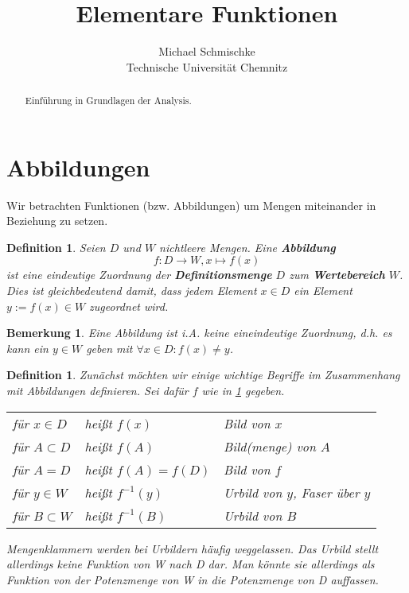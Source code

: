 \documentclass{article}
\title{Elementare Funktionen}
\author{Michael Schmischke\\
Technische Universit\"at Chemnitz
}
\newtheorem{bem}[lemma]{Bemerkung}
\newtheorem{definition}[lemma]{Definition}
\numberwithin{lemma}{section}
\begin{document}
\maketitle %

\begin{abstract}
	\noindent Einf\"uhrung in Grundlagen der Analysis. 
\end{abstract}


\section{Abbildungen}

Wir betrachten Funktionen (bzw. Abbildungen) um Mengen miteinander in Beziehung zu setzen.

\begin{definition}\label{def}
Seien $D$ und $W$ nichtleere Mengen. Eine \textbf{Abbildung} \[ f: D \to W, x \mapsto f(x) \] ist eine eindeutige Zuordnung der \textbf{Definitionsmenge} $D$ zum \textbf{Wertebereich} $W$. Dies ist gleichbedeutend damit, dass jedem Element $x \in D$ ein Element $y := f(x) \in W$ zugeordnet wird.
\end{definition}

\begin{bem}
Eine Abbildung ist i.A. keine eineindeutige Zuordnung, d.h. es kann ein $y \in W$ geben mit $\forall x \in D : f(x) \neq y$.
\end{bem}

\begin{definition}
Zunächst möchten wir einige wichtige Begriffe im Zusammenhang mit Abbildungen definieren. Sei dafür $f$ wie in \cref{def} gegeben.

\begin{tabular}{lll}
 für $x \in D$ & heißt $f(x)$ & Bild von $x$ \\
 für $A \subset D$ & heißt $f(A)$ & Bild(menge) von $A$ \\
 für $A = D$ & heißt $f(A)=f(D)$ & Bild von $f$ \\
 für $y \in W$ & heißt $f^{-1}(y)$ & Urbild von $y$, Faser über $y$ \\
 für $B \subset W$ & heißt $f^{-1}(B)$ & Urbild von $B$ 
\end{tabular}

Mengenklammern werden bei Urbildern häufig weggelassen. Das Urbild stellt allerdings keine Funktion von W nach D dar. Man könnte sie allerdings als Funktion von der Potenzmenge von W in die Potenzmenge von D auffassen.
\end{definition}
\end{document}
